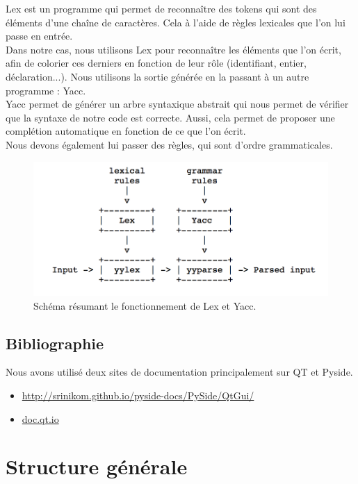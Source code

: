 \documentclass[a4paper,12pt]{article}
\begin{document}
	Lex est un programme qui permet de reconnaître des tokens qui sont des éléments d'une chaîne de caractères. Cela à l'aide de règles lexicales que l'on lui passe en entrée.\\
	Dans notre cas, nous utilisons Lex pour reconnaître les éléments que l'on écrit, afin de colorier ces derniers en fonction de leur rôle (identifiant, entier, déclaration...). Nous utilisons la sortie générée en la passant à un autre programme : Yacc.\\
	
	Yacc permet de générer un arbre syntaxique abstrait qui nous permet de vérifier que la syntaxe de notre code est correcte. Aussi, cela permet de proposer une complétion automatique en fonction de ce que l'on écrit.\\
	Nous devons également lui passer des règles, qui sont d'ordre grammaticales.
	
	\begin{figure}[h!]
		\begin{center}
			\includegraphics[scale=0.7]{images/schema_lex_yacc}
			\caption{Schéma résumant le fonctionnement de Lex et Yacc.}
		\end{center}
	\end{figure}
	
	\subsection{Bibliographie}
	
	Nous avons utilisé deux sites de documentation principalement sur QT et Pyside.
	\begin{itemize}
		\item \url{http://srinikom.github.io/pyside-docs/PySide/QtGui/}
		\item \url{doc.qt.io}
	\end{itemize}
	
\section{Structure générale}
\end{document}

